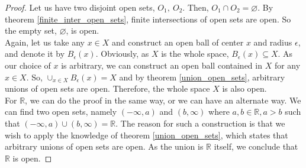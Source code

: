 \begin{proof}
    Let us have two disjoint open sets, $O_1,\ O_2$. Then, $O_1\cap O_2=\varnothing$. By theorem \eqref{finite_inter_open_sets}, finite intersections of open sets are open. So the empty set, $\varnothing$, is open.\\
    Again, let us take any $x\in X$ and construct an open ball of center $x$ and radius $\epsilon$, and denote it by $B_{\epsilon}(x)$. Obviously, as $X$ is the whole space, $B_{\epsilon}(x)\subseteq X$. As our choice of $x$ is arbitrary, we can construct an open ball contained in $X$ for any $x\in X$. So, $\cup_{x\in X}B_{\epsilon}(x)=X$ and by theorem \eqref{union_open_sets}, arbitrary unions of open sets are open. Therefore, the whole space $X$ is also open.\\
    For $\mathbb{R}$, we can do the proof in the same way, or we can have an alternate way. We can find two open sets, namely $(-\infty,a)$ and $(b,\infty)$ where $a,b\in\mathbb{R},a>b$ such that $(-\infty,a)\cup(b,\infty)=\mathbb{R}$. The reason for such a construction is that we wish to apply the knowledge of theorem \eqref{union_open_sets}, which states that arbitrary unions of open sets are open. As the union is $\mathbb{R}$ itself, we conclude that $\mathbb{R}$ is open.
\end{proof}
\exercise
